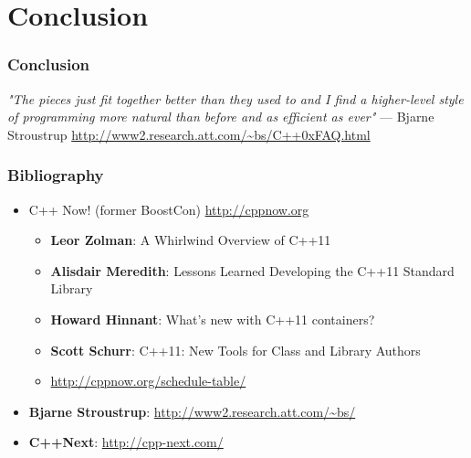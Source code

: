 \documentclass[xcolor=dvipsnames]{beamer}
\begin{document}
\section{Conclusion}
\begin{frame}
  \frametitle{Conclusion}

  \emph{"The pieces just fit together better than they used to and I find a
  higher-level style of programming more natural than before and as efficient as ever"}
  --- Bjarne Stroustrup {\footnotesize \url{http://www2.research.att.com/~bs/C++0xFAQ.html}}\\
  \vspace{0.2cm}
\end{frame}

\begin{frame}
  \frametitle{Bibliography}
  \begin{itemize}
    \item C++ Now! (former BoostCon) \url{http://cppnow.org}
      \begin{itemize}
        \item \textbf{Leor Zolman}: A Whirlwind Overview of C++11
        \item \textbf{Alisdair Meredith}: Lessons Learned Developing the C++11 Standard Library
        \item \textbf{Howard Hinnant}: What’s new with C++11 containers?
        \item \textbf{Scott Schurr}: C++11: New Tools for Class and Library Authors
        \item \url{http://cppnow.org/schedule-table/}
      \end{itemize}
    \item \textbf{Bjarne Stroustrup}: {\footnotesize \url{http://www2.research.att.com/~bs/}}
    \item \textbf{C++Next}: \url{http://cpp-next.com/}
  \end{itemize}
\end{frame}
\end{document}
